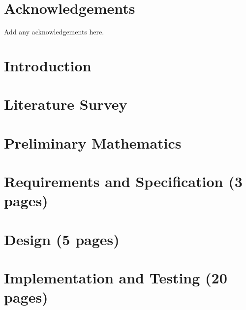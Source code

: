 
\maketitle
\newpage


\newpage


\declaration{\disstitle}{\authorname} %
\newpage


\abstract

\newpage


\tableofcontents
\newpage
\listoffigures
\newpage
\listoftables
\newpage


\chapter*{Acknowledgements}
Add any acknowledgements here.
\newpage


\setcounter{page}{1}



\chapter{Introduction}

\chapter{Literature Survey}


\chapter{Preliminary Mathematics}


\chapter{Requirements and Specification (3 pages)}


\chapter{Design (5 pages)}


\chapter{Implementation and Testing (20 pages)}


